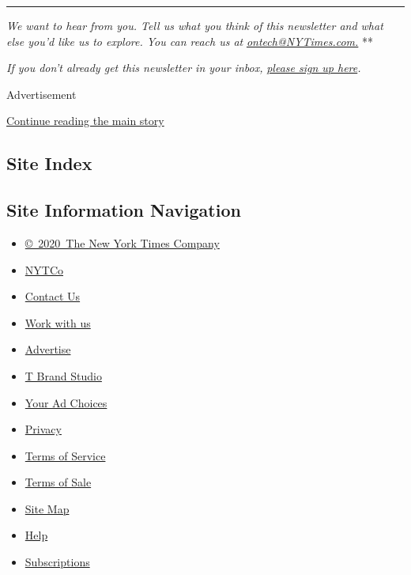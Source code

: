 \begin{center}\rule{0.5\linewidth}{\linethickness}\end{center}

\emph{We want to hear from you. Tell us what you think of this
newsletter and what else you'd like us to explore. You can reach us at}
\href{mailto:ontech@NYTimes.com?subject=On\%20Tech\%20Feedback}{\emph{ontech@NYTimes.com.}}
**

\emph{If you don't already get this newsletter in your inbox,}
\href{https://www.nytimes3xbfgragh.onion/newsletters/signup/OT}{\emph{please
sign up here}}\emph{.}

Advertisement

\protect\hyperlink{after-bottom}{Continue reading the main story}

\hypertarget{site-index}{%
\subsection{Site Index}\label{site-index}}

\hypertarget{site-information-navigation}{%
\subsection{Site Information
Navigation}\label{site-information-navigation}}

\begin{itemize}
\tightlist
\item
  \href{https://help.nytimes3xbfgragh.onion/hc/en-us/articles/115014792127-Copyright-notice}{©~2020~The
  New York Times Company}
\end{itemize}

\begin{itemize}
\tightlist
\item
  \href{https://www.nytco.com/}{NYTCo}
\item
  \href{https://help.nytimes3xbfgragh.onion/hc/en-us/articles/115015385887-Contact-Us}{Contact
  Us}
\item
  \href{https://www.nytco.com/careers/}{Work with us}
\item
  \href{https://nytmediakit.com/}{Advertise}
\item
  \href{http://www.tbrandstudio.com/}{T Brand Studio}
\item
  \href{https://www.nytimes3xbfgragh.onion/privacy/cookie-policy\#how-do-i-manage-trackers}{Your
  Ad Choices}
\item
  \href{https://www.nytimes3xbfgragh.onion/privacy}{Privacy}
\item
  \href{https://help.nytimes3xbfgragh.onion/hc/en-us/articles/115014893428-Terms-of-service}{Terms
  of Service}
\item
  \href{https://help.nytimes3xbfgragh.onion/hc/en-us/articles/115014893968-Terms-of-sale}{Terms
  of Sale}
\item
  \href{https://spiderbites.nytimes3xbfgragh.onion}{Site Map}
\item
  \href{https://help.nytimes3xbfgragh.onion/hc/en-us}{Help}
\item
  \href{https://www.nytimes3xbfgragh.onion/subscription?campaignId=37WXW}{Subscriptions}
\end{itemize}
